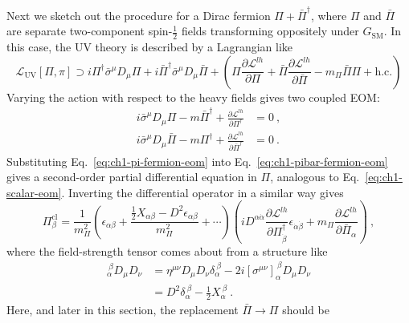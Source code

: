 Next we sketch out the procedure for a Dirac fermion
$\Pi + \bar{\Pi}^{\dagger}$, where $\Pi$ and $\bar{\Pi}$ are separate
two-component spin-$\tfrac{1}{2}$ fields transforming oppositely under
$G_{\text{SM}}$. In this case, the UV theory is described by a Lagrangian like
\begin{equation}
  \label{eq:ch1-fermion-lag}
  \mathscr{L}_{\text{UV}}[\Pi, \pi] \supset i \Pi^{\dagger} \bar{\sigma}^{\mu} D_{\mu} \Pi + i \bar{\Pi}^{\dagger} \bar{\sigma}^{\mu} D_{\mu} \bar{\Pi} + \left( \Pi \frac{\partial \mathscr{L}^{lh}}{\partial \Pi} + \bar{\Pi} \frac{\partial \mathscr{L}^{lh}}{\partial \bar{\Pi}} - m_{\Pi} \bar{\Pi} \Pi  + \text{h.c.} \right)
\end{equation}
Varying the action with respect to the heavy fields gives two coupled EOM:
\begin{align}
 i \bar{\sigma}^{\mu} D_{\mu} \Pi - m \bar{\Pi}^{\dagger} + \frac{\partial \mathscr{L}^{lh}}{\partial \Pi^{\dagger}} &= 0 \ , \label{eq:ch1-pi-fermion-eom} \\
 i \bar{\sigma}^{\mu} D_{\mu} \bar{\Pi} - m \Pi^{\dagger} + \frac{\partial \mathscr{L}^{lh}}{\partial \bar{\Pi}^{\dagger}} &= 0 \ . \label{eq:ch1-pibar-fermion-eom}
\end{align}
Substituting Eq.~\eqref{eq:ch1-pi-fermion-eom} into Eq.~\eqref{eq:ch1-pibar-fermion-eom}
gives a second-order partial differential equation in $\Pi$, analogous to
Eq.~\eqref{eq:ch1-scalar-eom}. Inverting the differential operator in a similar way
gives
\begin{equation}
  \label{eq:ch1-fermion-repl}
  \Pi^{\text{cl}}_{\beta} = \frac{1}{m_{\Pi}^{2}} \left( \epsilon_{\alpha \beta} + \frac{ \tfrac{1}{2} X_{\alpha \beta} - D^{2} \epsilon_{\alpha \beta}}{m_{\Pi}^{2}} + \cdots \right) \left( i D^{\alpha \dot{\alpha}} \frac{\partial \mathscr{L}^{lh}}{\partial \Pi^{\dagger}_{\dot{\beta}}} \epsilon_{\dot{\alpha} \dot{\beta}} + m_{\Pi} \frac{\partial \mathscr{L}^{lh}}{\partial \bar{\Pi}_{\alpha}} \right) \ ,
\end{equation}
where the field-strength tensor comes about from a structure like
\begin{align}
  [\sigma^{\mu} \bar{\sigma}^{\nu}]_{\alpha}^{\ \beta} D_{\mu} D_{\nu} &= \eta^{\mu\nu} D_{\mu} D_{\nu} \delta_{\alpha}^{\ \beta} - 2i [\sigma^{\mu\nu}]_{\alpha}^{\ \beta} D_{\mu} D_{\nu} \\
  &= D^{2} \delta_{\alpha}^{\ \beta} - \tfrac{1}{2} X_{\alpha}^{\ \beta} \ .
\end{align}
Here, and later in this section, the replacement $\bar{\Pi} \to \Pi$ should be
